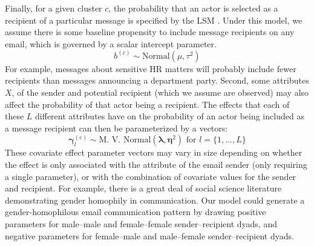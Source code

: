 \documentclass{pnastwo}
\begin{document}
\begin{article}
Finally, for a given cluster $c$, the probability that an actor is selected as a recipient of a particular message is specified by the LSM \citep{Hoff2002a}. Under this model, we assume there is some baseline propensity to include message recipients on any email, which is governed by a scalar intercept parameter.
\begin{equation}
	b^{(c)} \sim \text{Normal}(\mu, \tau^2)
\end{equation} 
For example, messages about sensitive HR matters will probably include fewer recipients than messages announcing a department party. Second, some attributes $X$, of the sender and potential recipient (which we assume are observed) may also affect the probability of that actor being a recipient. The effects that each of these $L$ different attributes have on the probability of an actor being included as a message recipient can then be parameterized by a vectors: 
\begin{equation}
	\mathbf{\gamma}_l^{(c)} \sim \text{M. V. Normal}(\mathbf{\lambda}, \mathbf{\eta}^2) \text{ for } l = \{1, ..., L\}
\end{equation}
These covariate effect parameter vectors may vary in size depending on whether the effect is only associated with the attribute of the email sender (only requiring a single parameter), or with the combination of covariate values for the sender and recipient. For example, there is a great deal of social science literature demonstrating gender homophily in communication. Our model could generate a gender-homophilous email communication pattern by drawing positive parameters for male--male and female--female sender--recipient dyads, and negative parameters for female--male and male--female sender--recipient dyads. 


\end{article}
\end{document}
